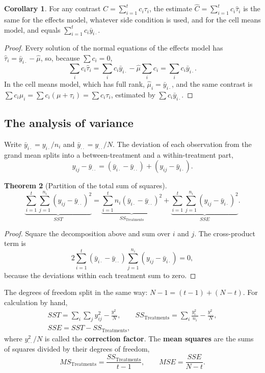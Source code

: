 \documentclass[11pt,a4paper]{article}
\numberwithin{equation}{section}
\theoremstyle{definition}
\newtheorem{thm}{Theorem}[subsection]
\newtheorem{coro}[thm]{Corollary}
\begin{document}
\begin{coro}\label{coro:contrast-invariance}
For any contrast $C = \sum_{i=1}^tc_i\tau_i$, the estimate $\hat C = \sum_{i=1}^tc_i\hat\tau_i$ is the same for the effects model, whatever side condition is used, and for
the cell means model, and equals $\sum_{i=1}^tc_i\bar y_{i\cdot}$.
\end{coro}

\begin{proof}
Every solution of the normal equations of the effects model has $\hat\tau_i = \bar y_{i\cdot} - \hat\mu$, so, because $\sum c_i = 0$,
\[
\sum_ic_i\hat\tau_i = \sum_ic_i\bar y_{i\cdot} - \hat\mu\sum_ic_i = \sum_ic_i\bar y_{i\cdot} .
\]
In the cell means model, which has full rank, $\hat\mu_i = \bar y_{i\cdot}$, and the same contrast is $\sum c_i\mu_i = \sum c_i(\mu + \tau_i) = \sum c_i\tau_i$, estimated by $\sum c_i\bar y_{i\cdot}$.
\end{proof}

\subsection{The analysis of variance}
Write $\bar y_{i\cdot} = y_{i\cdot}/n_i$ and $\bar y_{\cdot\cdot} = y_{\cdot\cdot}/N$. The deviation of each observation from the grand mean splits into a between-treatment and a
within-treatment part,
\[
y_{ij} - \bar y_{\cdot\cdot} = (\bar y_{i\cdot} - \bar y_{\cdot\cdot}) + (y_{ij} - \bar y_{i\cdot}) .
\]

\begin{thm}[Partition of the total sum of squares]\label{thm:partition}
\[
\underbrace{\sum_{i=1}^t\sum_{j=1}^{n_i}(y_{ij} - \bar y_{\cdot\cdot})^2}_{SST} = \underbrace{\sum_{i=1}^tn_i(\bar y_{i\cdot} - \bar y_{\cdot\cdot})^2}_{SS_{\mathrm{Treatments}}} + \underbrace{\sum_{i=1}^t\sum_{j=1}^{n_i}(y_{ij} - \bar y_{i\cdot})^2}_{SSE} .
\]
\end{thm}

\begin{proof}
Square the decomposition above and sum over $i$ and $j$. The cross-product term is
\[
2\sum_{i=1}^t(\bar y_{i\cdot} - \bar y_{\cdot\cdot})\sum_{j=1}^{n_i}(y_{ij} - \bar y_{i\cdot}) = 0 ,
\]
because the deviations within each treatment sum to zero.
\end{proof}

The degrees of freedom split in the same way: $N - 1 = (t - 1) + (N - t)$. For calculation by hand,
\begin{gather*}
SST = \sum_i\sum_jy_{ij}^2 - \frac{y_{\cdot\cdot}^2}{N} , \qquad SS_{\mathrm{Treatments}} = \sum_i\frac{y_{i\cdot}^2}{n_i} - \frac{y_{\cdot\cdot}^2}{N} , \\
SSE = SST - SS_{\mathrm{Treatments}} ,
\end{gather*}
where $y_{\cdot\cdot}^2/N$ is called the \textbf{correction factor}. The \textbf{mean squares} are the sums of squares divided by their degrees of freedom,
\[
MS_{\mathrm{Treatments}} = \frac{SS_{\mathrm{Treatments}}}{t - 1} , \qquad MSE = \frac{SSE}{N - t} .
\]
\end{document}
